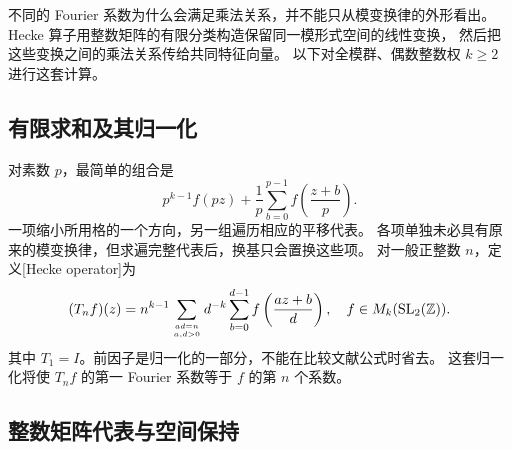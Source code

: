不同的 Fourier 系数为什么会满足乘法关系，并不能只从模变换律的外形看出。
Hecke 算子用整数矩阵的有限分类构造保留同一模形式空间的线性变换，
然后把这些变换之间的乘法关系传给共同特征向量。
以下对全模群、偶数整数权 \(k\ge2\) 进行这套计算。

\subsection{有限求和及其归一化}
\label{b3:subsec:E0201}

对素数 \(p\)，最简单的组合是
\[
 p^{k-1}f(pz)+\frac1p\sum_{b=0}^{p-1}f\left(\frac{z+b}p\right).
\]
一项缩小所用格的一个方向，另一组遍历相应的平移代表。
各项单独未必具有原来的模变换律，但求遍完整代表后，换基只会置换这些项。
对一般正整数 \(n\)，定义[Hecke operator]为
\begin{equation}\label{b3:eq:E-hecke-definition}
 (T_nf)(z)=n^{k-1}\sum_{ad=n\atop a,d>0}d^{-k}
                  \sum_{b=0}^{d-1}f\left(\frac{az+b}{d}\right),
 \quad f\in M_k(\mathrm{SL}_2(\mathbb Z)).
\end{equation}
其中 \(T_1=I\)。前因子是归一化的一部分，不能在比较文献公式时省去。
这套归一化将使 \(T_nf\) 的第一 Fourier 系数等于 \(f\) 的第 \(n\) 个系数。

\subsection{整数矩阵代表与空间保持}
\label{b3:subsec:E0202}

